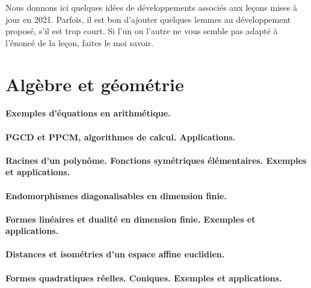 
Nous donnons ici quelques idées de développements associés aux leçons mises à jour en 2021. Parfois, il est bon d'ajouter quelques lemmes au développement proposé, s'il est trop court. Si l'un ou l'autre ne vous semble pas adapté à l'énoncé de la leçon, faites le moi savoir.

\section{Algèbre et géométrie}

\paragraph{Exemples d'équations en arithmétique.}


\paragraph{PGCD et PPCM, algorithmes de calcul. Applications.}
\paragraph{Racines d'un polynôme. Fonctions symétriques élémentaires. Exemples et applications.}
\paragraph{Endomorphismes diagonalisables en dimension finie.}
\paragraph{Formes linéaires et dualité en dimension finie. Exemples et applications.}
\paragraph{Distances et isométries d'un espace affine euclidien.}
\paragraph{Formes quadratiques réelles. Coniques. Exemples et applications.}

